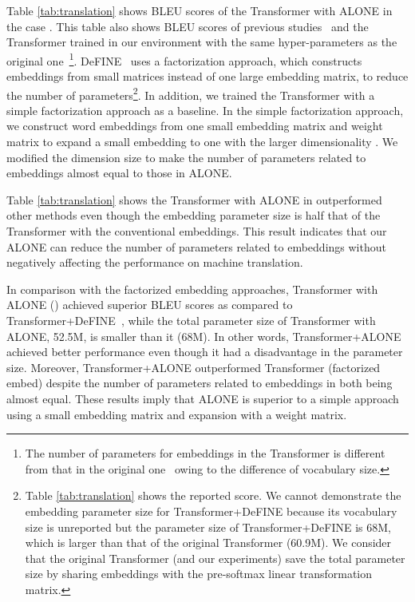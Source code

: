 \documentclass{article}
\begin{document}
Table \ref{tab:translation} shows BLEU scores of the Transformer with ALONE in the case .
This table also shows BLEU scores of previous studies~\cite{pmlr-v70-gehring17a,NIPS2017_7181,factorizationInput} and the Transformer trained in our environment with the same hyper-parameters as the original one~\cite{NIPS2017_7181}\footnote{The number of parameters for embeddings in the Transformer is different from that in the original one~\cite{NIPS2017_7181} owing to the difference of vocabulary size.}.
DeFINE~\cite{factorizationInput} uses a factorization approach, which constructs embeddings from small matrices instead of one large embedding matrix, to reduce the number of parameters\footnote{Table \ref{tab:translation} shows the reported score. We cannot demonstrate the embedding parameter size for Transformer+DeFINE because its vocabulary size is unreported but the parameter size of Transformer+DeFINE is 68M, which is larger than that of the original Transformer (60.9M). We consider that the original Transformer (and our experiments) save the total parameter size by sharing embeddings with the pre-softmax linear transformation matrix.}.
In addition, we trained the Transformer with a simple factorization approach as a baseline.
In the simple factorization approach, we construct word embeddings from one small embedding matrix and weight matrix to expand a small embedding to one with the larger dimensionality .
We modified the dimension size to make the number of parameters related to embeddings almost equal to those in ALONE.


Table \ref{tab:translation} shows the Transformer with ALONE in  outperformed other methods even though the embedding parameter size is half that of the Transformer with the conventional embeddings.
This result indicates that our ALONE can reduce the number of parameters related to embeddings without negatively affecting the performance on machine translation.


In comparison with the factorized embedding approaches, Transformer with ALONE () achieved superior BLEU scores as compared to Transformer+DeFINE~\cite{factorizationInput}, while the total parameter size of Transformer with ALONE, 52.5M, is smaller than it (68M).
In other words, Transformer+ALONE achieved better performance even though it had a disadvantage in the parameter size.
Moreover, Transformer+ALONE outperformed Transformer (factorized embed) despite the number of parameters related to embeddings in both being almost equal.
These results imply that ALONE is superior to a simple approach using a small embedding matrix and expansion with a weight matrix.
\end{document}
